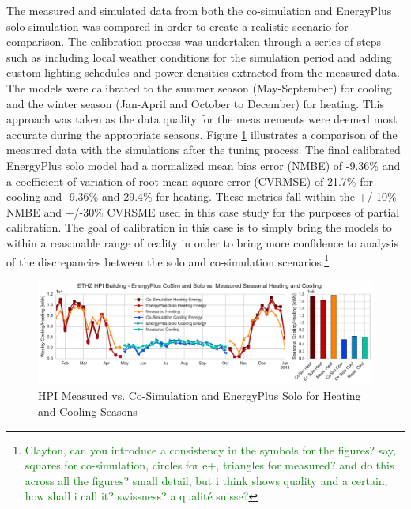 \documentclass{tBPS2e}
\theoremstyle{plain}
\theoremstyle{definition}
\theoremstyle{remark}
\newcommand{\noteDT}[1]{\footnote{\textcolor{green}{#1}}}
\begin{document}
The measured and simulated data from both the co-simulation and EnergyPlus solo simulation was compared in order to create a realistic scenario for comparison. The calibration process was undertaken through a series of steps such as including local weather conditions for the simulation period and adding custom lighting schedules and power densities extracted from the measured data. The models were calibrated to the summer season (May-September) for cooling and the winter season (Jan-April and October to December) for heating. This approach was taken as the data quality for the measurements were deemed most accurate during the appropriate seasons. Figure \ref{fig:hpi_measvssim} illustrates a comparison of the measured data with the simulations after the tuning process. The final calibrated EnergyPlus solo model had a normalized mean bias error (NMBE) of -9.36\% and a coefficient of variation of root mean square error (CVRMSE) of 21.7\% for cooling and -9.36\% and 29.4\% for heating. These metrics fall within the +/-10\% NMBE and +/-30\% CVRSME used in this case study for the purposes of partial calibration. The goal of calibration in this case is to simply bring the models to within a reasonable range of reality in order to bring more confidence to analysis of the discrepancies between the solo and co-simulation scenarios.\noteDT{Clayton, can you introduce a consistency in the symbols for the figures? say, squares for co-simulation, circles for e+, triangles for measured? and do this across all the figures? small detail, but i think shows quality and a certain, how shall i call it? swissness? a qualité suisse?}

\begin{figure}[H]
\centering
\includegraphics[scale=0.55]{figures/HPI_MeasvsSim}
\caption{HPI Measured vs. Co-Simulation and EnergyPlus Solo for Heating and Cooling Seasons}
\label{fig:hpi_measvssim}
\end{figure}
\end{document}
